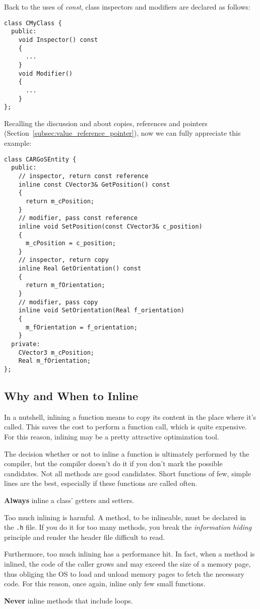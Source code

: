 \documentclass[a4paper]{article}
\begin{document}
Back to the uses of {\it const}, class inspectors and modifiers are
declared as follows:
\begin{lstlisting}
class CMyClass {
  public:
    void Inspector() const
    {
      ...
    }
    void Modifier()
    {
      ...
    }
};
\end{lstlisting}
Recalling the discussion and about copies, references and pointers
(Section~\ref{subsec:value_reference_pointer}), now we can fully
appreciate this example:
%
\begin{lstlisting}
class CARGoSEntity {
  public:
    // inspector, return const reference
    inline const CVector3& GetPosition() const
    {
      return m_cPosition;
    }
    // modifier, pass const reference
    inline void SetPosition(const CVector3& c_position)
    {
      m_cPosition = c_position;
    }
    // inspector, return copy
    inline Real GetOrientation() const
    {
      return m_fOrientation;
    }
    // modifier, pass copy
    inline void SetOrientation(Real f_orientation)
    {
      m_fOrientation = f_orientation;
    }
  private:
    CVector3 m_cPosition;
    Real m_fOrientation;
};
\end{lstlisting}

\subsection{Why and When to Inline}
\label{subsec:inline}
In a nutshell, inlining a function means to copy its content in the
place where it's called. This saves the cost to perform a function
call, which is quite expensive. For this reason, inlining may be a
pretty attractive optimization tool.

The decision whether or not to inline a function is ultimately
performed by the compiler, but the compiler doesn't do it if you don't
mark the possible candidates. Not all methods are good
candidates. Short functions of few, simple lines are the best,
especially if these functions are called often.
\begin{warning}
  {\bf Always} inline a class' getters and setters.
\end{warning}
Too much inlining is harmful. A method, to be inlineable, must be
declared in the \verb!.h! file. If you do it for too many methods, you
break the {\it information hiding} principle and render the header
file difficult to read.

Furthermore, too much inlining has a performance hit. In fact, when a
method is inlined, the code of the caller grows and may exceed the
size of a memory page, thus obliging the OS to load and unload memory
pages to fetch the necessary code. For this reason, once again, inline
only few small functions.
\begin{warning}
  {\bf Never} inline methods that include loops.
\end{warning}
\end{document}
